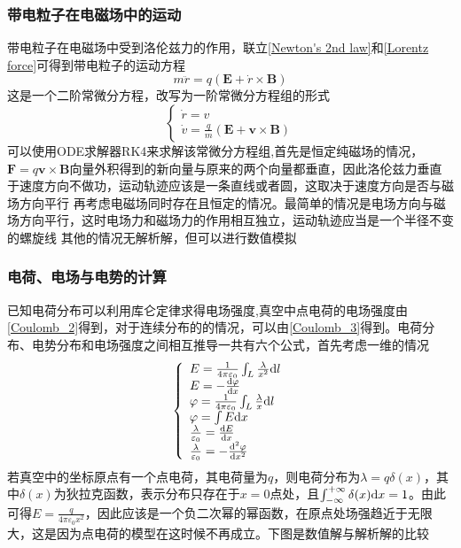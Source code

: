 \documentclass[UTF8,a4paper,10pt]{ctexart}
\begin{document}
\begin{multicols}{2}
            \subsubsection{带电粒子在电磁场中的运动}
            带电粒子在电磁场中受到洛伦兹力的作用，联立\eqref{Newton's 2nd law}和\eqref{Lorentz force}可得到带电粒子的运动方程
            \begin{equation}
                m\ddot{r} = q(\bm{E} + \dot{r}\times \bm{B})
            \end{equation}
            这是一个二阶常微分方程，改写为一阶常微分方程组的形式
            \begin{equation}
                \left\{\begin{array}{l}
                    \dot{r} = v\\
                    \dot{v} = \frac{q}{m}(\bm{E} + \bm{v}\times \bm{B})
                \end{array}\right.
            \end{equation}
            可以使用ODE求解器RK4来求解该常微分方程组,首先是恒定纯磁场的情况，$\bm{F} = q\bm{v}\times\bm{B}$向量外积得到的新向量与原来的两个向量都垂直，因此洛伦兹力垂直于速度方向不做功，运动轨迹应该是一条直线或者圆，这取决于速度方向是否与磁场方向平行
            再考虑电磁场同时存在且恒定的情况。最简单的情况是电场方向与磁场方向平行，这时电场力和磁场力的作用相互独立，运动轨迹应当是一个半径不变的螺旋线
            其他的情况无解析解，但可以进行数值模拟
            \subsubsection{电荷、电场与电势的计算}
            已知电荷分布可以利用库仑定律求得电场强度,真空中点电荷的电场强度由\eqref{Coulomb_2}得到，对于连续分布的的情况，可以由\eqref{Coulomb_3}得到。电荷分布、电势分布和电场强度之间相互推导一共有六个公式，首先考虑一维的情况
            \begin{equation}
                \left\{\begin{array}{l}
                    E = \frac{1}{4\pi\varepsilon_0}\int_L\frac{\lambda}{x^2}{\rm d}l\\
                    E = -\frac{{\rm d}\varphi}{{\rm d}x}\\
                    \varphi = \frac{1}{4\pi\varepsilon_0}\int_L\frac{\lambda}{x}{\rm d}l\\
                    \varphi = \int E{\rm d}x\\
                    \frac{\lambda}{\varepsilon_0} = \frac{{\rm d}E}{{\rm d}x}\\
                    \frac{\lambda}{\varepsilon_0} = -\frac{{\rm d^2}\varphi}{{\rm d}x^2}
                \end{array}\right.
            \end{equation}
            若真空中的坐标原点有一个点电荷，其电荷量为$q$，则电荷分布为$\lambda = q\delta(x)$，其中$\delta(x)$为狄拉克函数，表示分布只存在于$x = 0$点处，且$\int_{-\infty}^{+\infty}\delta(x){\rm d}x = 1$。由此可得$E = \frac{q}{4\pi\varepsilon_0x^2}$，因此应该是一个负二次幂的幂函数，在原点处场强趋近于无限大，这是因为点电荷的模型在这时候不再成立。下图是数值解与解析解的比较


\end{multicols}
\end{document}
